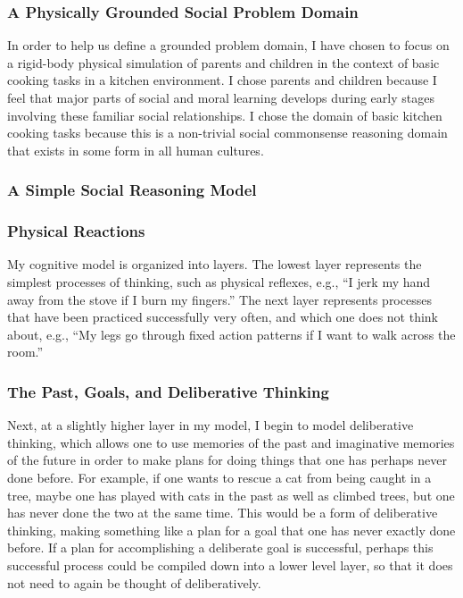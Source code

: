 \subsubsection{A Physically Grounded Social Problem Domain}

In order to help us define a grounded problem domain, I have chosen to
focus on a rigid-body physical simulation of parents and children in
the context of basic cooking tasks in a kitchen environment. I chose
parents and children because I feel that major parts of social and
moral learning develops during early stages involving these familiar
social relationships. I chose the domain of basic kitchen cooking
tasks because this is a non-trivial social commonsense reasoning
domain that exists in some form in all human cultures.

\subsubsection{A Simple Social Reasoning Model}

\subsubsection{Physical Reactions}

My cognitive model is organized into layers. The lowest layer
represents the simplest processes of thinking, such as physical
reflexes, e.g., ``I jerk my hand away from the stove if I burn my
fingers.'' The next layer represents processes that have been practiced
successfully very often, and which one does not think about, e.g., ``My
legs go through fixed action patterns if I want to walk across the
room.''

\subsubsection{The Past, Goals, and Deliberative Thinking}

Next, at a slightly higher layer in my model, I begin to model
deliberative thinking, which allows one to use memories of the past
and imaginative memories of the future in order to make plans for
doing things that one has perhaps never done before. For example, if
one wants to rescue a cat from being caught in a tree, maybe one has
played with cats in the past as well as climbed trees, but one has
never done the two at the same time. This would be a form of
deliberative thinking, making something like a plan for a goal that
one has never exactly done before. If a plan for accomplishing a
deliberate goal is successful, perhaps this successful process could
be compiled down into a lower level layer, so that it does not need to
again be thought of deliberatively.

